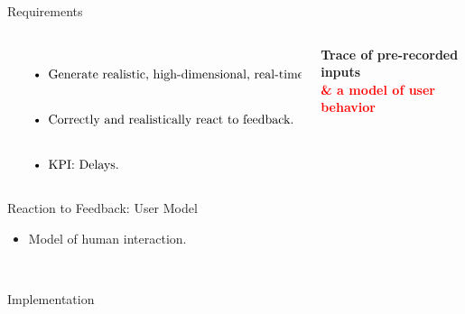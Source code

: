 \documentclass[aspectratio=1610]{beamer}
\begin{document}
\begin{frame}{Requirements}
    \begin{columns}[onlytextwidth]
        \begin{column}{.5\linewidth}
            $\left.
            \begin{tabular}{p{.8\linewidth}}
                \begin{itemize}
                    \itemsep2em
                    \item Generate realistic, high-dimensional, real-time inputs.
                    \item Correctly and realistically react to feedback.
                    \item KPI: Delays.
                \end{itemize}
            \end{tabular}%
            \right\}$
        \end{column}%
        \begin{column}{.5\linewidth}
            \centering%
            \Large\bfseries%
            Trace of pre-recorded inputs\\
            \textcolor{red}{\& a model of user behavior}\\
        \end{column}
    \end{columns}
\end{frame}

\begin{frame}{Reaction to Feedback: User Model}
    \begin{itemize}
        \item Model of human interaction.
    \end{itemize}
    \begin{center}
        \\
        \vspace{.1\textheight}%
    \end{center}
\end{frame}

\begin{frame}{Implementation}
    \begin{center}
        
    \end{center}
\end{frame}
\end{document}
